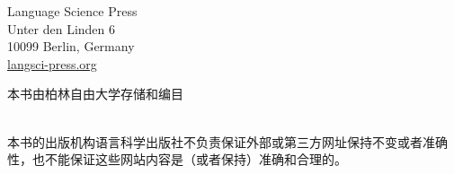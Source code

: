 {\bigskip

Language Science Press\\
Unter den Linden 6\\
10099 Berlin, Germany\\
\href{http://langsci-press.org}{langsci-press.org}

\vfill

本书由柏林自由大学存储和编目 \\[3ex]

 \\[3ex]

\vfill

\noindent
本书的出版机构语言科学出版社不负责保证外部或第三方网址保持不变或者准确性，也不能保证这些网站内容是（或者保持）准确和合理的。
}


\makeatother



\newcommand{\mytrans}[1]{\trans\quotetrans{#1}}

\newcommand{\quotetrans}[1]{‘#1’}







